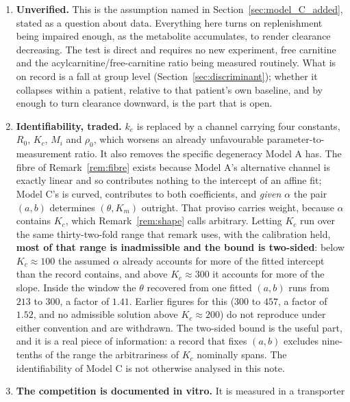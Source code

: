 \begin{enumerate}[leftmargin=*, itemsep=2pt]
\item \textbf{Unverified.} This is the assumption named in
      Section~\ref{sec:model_C_added}, stated as a question about data. Everything here
      turns on replenishment being impaired enough, as the metabolite accumulates, to
      render clearance decreasing. The test is direct and
      requires no new experiment, free carnitine and the acylcarnitine/free-carnitine ratio
      being measured routinely. What is on record is a fall at group level
      (Section~\ref{sec:discriminant}); whether it collapses within a patient, relative to
      that patient's own baseline, and by enough to turn clearance downward, is the part
      that is open.
\item \textbf{Identifiability, traded.} $k_e$ is replaced by a
      channel carrying four constants, $R_0$, $K_c$, $M_i$ and $\rho_0$, which worsens an
      already unfavourable parameter-to-measurement ratio. It also removes the specific
      degeneracy Model A has. The fibre of Remark~\ref{rem:fibre} exists because Model A's
      alternative channel is exactly linear and so contributes nothing to the intercept of
      an affine fit; Model C's is curved, contributes to both coefficients, and
      \emph{given $\alpha$} the pair $(a,b)$ determines $(\theta, K_m)$ outright. That
      proviso carries weight, because $\alpha$ contains $K_c$, which
      Remark~\ref{rem:shape} calls arbitrary. Letting $K_c$ run over the same
      thirty-two-fold range that remark uses, with the calibration held, \textbf{most of
      that range is inadmissible and the bound is two-sided}: below $K_c \approx 100$ the
      assumed $\alpha$ already accounts for more of the fitted intercept than the record
      contains, and above $K_c \approx 300$ it accounts for more of the slope. Inside the
      window the $\theta$ recovered from one fitted $(a,b)$ runs from $213$ to $300$, a
      factor of $1.41$. Earlier figures for this ($300$ to $457$, a factor of $1.52$, and no
      admissible solution above $K_c \approx 200$) do not reproduce under either convention
      and are withdrawn. The two-sided bound is the useful part, and it is a real piece of
      information: a record that fixes $(a,b)$ excludes nine-tenths of the range the
      arbitrariness of $K_c$ nominally spans. The identifiability of Model C is
      not otherwise analysed in this note.
\item \textbf{The competition is documented in vitro.} It is measured in a transporter

\end{enumerate}
